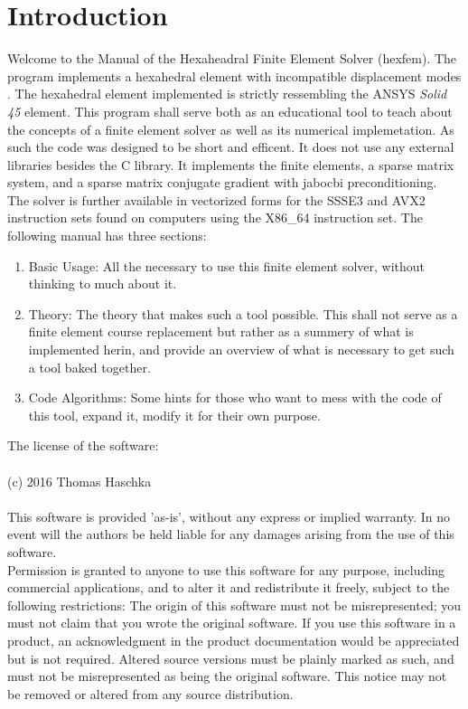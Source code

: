 \chapter{Introduction}

Welcome to the Manual of the Hexaheadral Finite Element Solver (hexfem).
The program implements a hexahedral element with incompatible displacement
modes \cite{incomp1, incomp2}. The hexahedral element implemented is
strictly ressembling the ANSYS \emph{Solid 45} element. This program
shall serve both as an educational tool to teach about the concepts of
a finite element solver as well as its numerical implemetation. As
such the code was designed to be short and efficent. It does not use
any external libraries besides the C library. It implements the finite
elements, a sparse matrix system, and a sparse matrix conjugate
gradient with jabocbi preconditioning. The solver is further available
in vectorized forms for the SSSE3 and AVX2 instruction sets found on
computers using the X86\_64 instruction set. \newline \newline
The following manual has three sections:
\newline \newline
\begin{enumerate}
\item{Basic Usage: All the necessary to use this finite element
  solver, without thinking to much about it.}
\item{Theory: The theory that makes such a tool possible. This shall
  not serve as a finite element course replacement but rather as a
  summery of what is implemented herin, and provide an overview of
  what is necessary to get such a tool baked together.}
\item{Code Algorithms: Some hints for those who want to mess with the
  code of this tool, expand it, modify it for their own purpose.}
\end{enumerate}
\newpage
The license of the software:\\ \\
(c) 2016 Thomas Haschka\\ \\
This software is provided 'as-is', without any express or implied
warranty. In no event will the authors be held liable for any damages
arising from the use of this software. \\
Permission is granted to anyone to use this software for any purpose,
including commercial applications, and to alter it and redistribute it
freely, subject to the following restrictions: \newline
The origin of this software must not be misrepresented; you must not
claim that you wrote the original software. If you use this software
in a product, an acknowledgment in the product documentation would be
appreciated but is not required.\newline
Altered source versions must be plainly marked as such, and must not
be misrepresented as being the original software. \newline
This notice may not be removed or altered from any source distribution.
